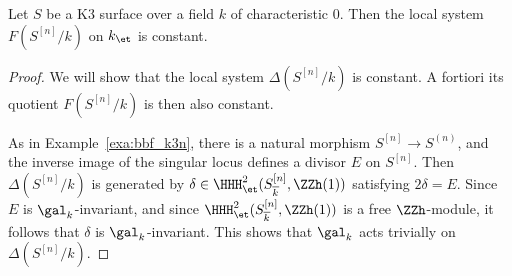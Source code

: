 \begin{lemma}\label{lem:markman_lemma}
Let $S$ be a K3 surface over a field $k$ of characteristic $0$. Then the local system $F(S^{[n]}/k)$ on $k_{\et}$ is constant.
\end{lemma}
\begin{proof}
We will show that the local system $\Delta(S^{[n]}/k)$ is constant. A fortiori its quotient $F(S^{[n]}/k)$ is then also constant.

As in Example~\ref{exa:bbf_k3n}, there is a natural morphism $S^{[n]} \rightarrow S^{(n)}$, and the inverse image of the singular locus defines a divisor $E$ on $S^{[n]}$. Then $\Delta(S^{[n]}/k)$ is generated by $\delta \in \HHH^2_{\et}(S^{[n]}_{\overline{k}},\ZZh(1))$ satisfying $2 \delta = E$. Since $E$ is $\gal_{k}$-invariant, and since $\HHH^2_{\et}(S^{[n]}_{\overline{k}},\ZZh(1))$ is a free $\ZZh$-module, it follows that $\delta$ is $\gal_{k}$-invariant. This shows that $\gal_{k}$ acts trivially on $\Delta(S^{[n]}/k)$.
\end{proof}

